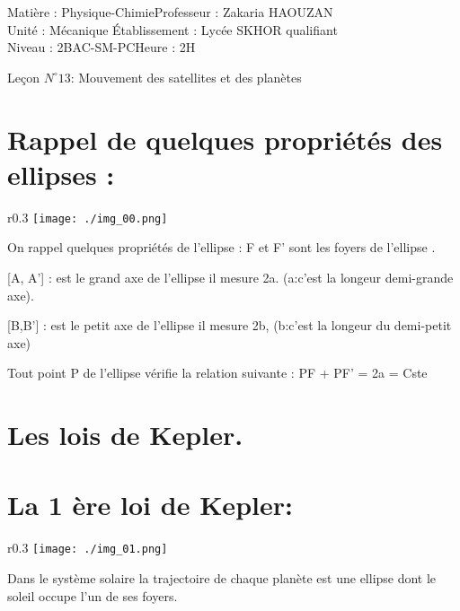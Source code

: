 \documentclass[12pt]{article}
\author{Zakaria HAOUZAN}
\date{\today}
\newcommand\headerMe[2]{\noindent{}#1\hfill#2}
\begin{document}
\headerMe{Matière : Physique-Chimie}{Professeur : Zakaria HAOUZAN}\\
\headerMe{Unité : Mécanique }{Établissement : Lycée SKHOR qualifiant}\\
\headerMe{Niveau : 2BAC-SM-PC}{Heure : 2H}\\

\begin{center}

    \Large{Leçon $N^{\circ} 13 $: \color{red}Mouvement des satellites et des planètes}
\end{center}


\section{Rappel de quelques propriétés des ellipses : }
\begin{wrapfigure}{r}{0.3\textwidth}
	\vspace{-2cm}
	\texttt{[image: ./img\_00.png]}
\end{wrapfigure}


On rappel quelques propriétés de l'ellipse : F et F' sont les foyers de l'ellipse .

[A, A'] : est le grand axe de l'ellipse il mesure 2a. (a:c'est la longeur demi-grande axe).

[B,B'] : est le petit axe de l'ellipse il mesure 2b, (b:c'est la longeur du demi-petit axe)

Tout point P de l'ellipse vérifie la relation  suivante : PF + PF' = 2a = Cste


\section{Les lois de Kepler.}

\section*{La 1 ère loi de Kepler:}
\begin{wrapfigure}{r}{0.3\textwidth}
	\vspace{-2cm}
	\texttt{[image: ./img\_01.png]}
\end{wrapfigure}
Dans le système solaire la trajectoire de chaque planète est une ellipse dont le soleil occupe l'un de ses foyers.
\end{document}
